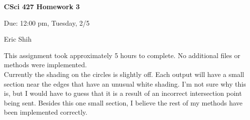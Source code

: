 \documentclass[11pt]{article}
\begin{document}
\begin{LARGE}
\centerline {\bf CSci 427 Homework 3}
\end{LARGE}
\vskip 0.25cm

\centerline{Due: 12:00 pm, Tuesday, 2/5}
\centerline{Eric Shih}

\setlength{\parindent}{1cm}
\indent This assignment took approximately 5 hours to complete. No additional files or methods were implemented. \\
\indent Currently the shading on the circles is slightly off. Each output will have a small section near the edges that have an unusual
white shading. I'm not sure why this is, but I would have to guess that it is a result of an incorrect intersection point being sent. Besides this one small section, I believe the
rest of my methods have been implemented correctly.
\end{document}
